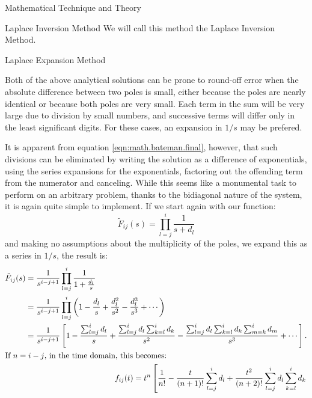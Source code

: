 \begin{chapter}{Mathematical Technique and Theory}
\begin{section}{Laplace Inversion Method}
  We will call this method the Laplace Inversion Method.

\end{section}  
  
\begin{section}{Laplace Expansion Method}\label{sec:math.expansion}
    
  Both of the above analytical solutions can be prone to round-off
  error when the absolute difference between two poles is small,
  either because the poles are nearly identical or because both poles
  are very small.  Each term in the sum will be very large due to
  division by small numbers, and successive terms will differ only in
  the least significant digits.  For these cases, an expansion in
  $1/s$ may be prefered.
    
  It is apparent from equation \ref{eqn:math.bateman.final}, however,
  that such divisions can be eliminated by writing the solution as a
  difference of exponentials, using the series expansions for the
  exponentials, factoring out the offending term from the numerator
  and canceling.  While this seems like a monumental task to perform
  on an arbitrary problem, thanks to the bidiagonal nature of the
  system, it is again quite simple to implement.  If we start again
  with our function:
  \begin{equation}
    \tilde{F}_{ij}(s) = \prod_{l=j}^{i}\frac{1}{s+d_l}
  \end{equation}
  and making no assumptions about the multiplicity of the poles, we
  expand this as a series in $1/s$, the result is:
  \begin{align}
    \begin{split}
      \tilde{F}_{ij}(s) &=\frac{1}{s^{i-j+1}} \prod_{l=j}^i\frac{1}{1+\frac{d_l}{s}}\\
      &=\frac{1}{s^{i-j+1}} \prod_{l=j}^i 
      \left(1 - \frac{d_l}{s} + \frac{d_l^2}{s^2} - \frac{d_l^3}{s^3} + \cdots \right )\\
      &= \frac{1}{s^{i-j+1}} \left [ 1 - \frac{\sum_{l=j}^i d_l}{s} +
        \frac{\sum_{l=j}^{i}d_l\sum_{k=l}^i d_k}{s^2} - 
        \frac{\sum_{l=j}^{i}d_l \sum_{k=l}^i d_k \sum_{m=k}^i d_m}{s^3} + \cdots
      \right ].
    \end{split}\\
    \intertext{If $n=i-j$, in the time domain, this becomes:}
    \begin{split}
      f_{ij}(t) &= t^{n} \left[ \frac{1}{n!} - \frac{t}{(n+1)!}\sum_{l=j}^i d_l 
        +\frac{t^2}{(n+2)!}\sum_{l=j}^{i}d_l \sum_{k=l}^i d_k\right.\\  

\end{split}
\end{align}
\end{section}
\end{chapter}
